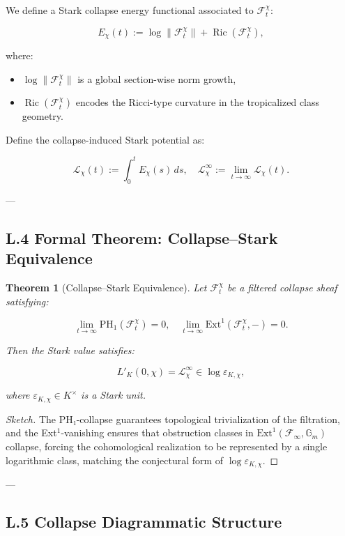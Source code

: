 \documentclass[11pt]{article}
\newtheorem{theorem}{Theorem}[section]
\begin{document}
We define a Stark collapse energy functional associated to $\mathcal{F}^\chi_t$:

\[
E_\chi(t) := \log \|\mathcal{F}^\chi_t\| + \operatorname{Ric}(\mathcal{F}^\chi_t),
\]

where:
\begin{itemize}
  \item $\log \|\mathcal{F}^\chi_t\|$ is a global section-wise norm growth,
  \item $\operatorname{Ric}(\mathcal{F}^\chi_t)$ encodes the Ricci-type curvature in the tropicalized class geometry.
\end{itemize}

Define the collapse-induced Stark potential as:

\[
\mathcal{L}_\chi(t) := \int_0^t E_\chi(s) \, ds,
\quad
\mathcal{L}_\chi^\infty := \lim_{t \to \infty} \mathcal{L}_\chi(t).
\]

---

\subsection*{L.4 Formal Theorem: Collapse–Stark Equivalence}

\begin{theorem}[Collapse–Stark Equivalence]
Let $\mathcal{F}^\chi_t$ be a filtered collapse sheaf satisfying:

\[
\lim_{t \to \infty} \mathrm{PH}_1(\mathcal{F}^\chi_t) = 0, \quad \lim_{t \to \infty} \mathrm{Ext}^1(\mathcal{F}^\chi_t, -) = 0.
\]

Then the Stark value satisfies:

\[
L'_K(0, \chi) = \mathcal{L}_\chi^\infty \in \log \varepsilon_{K,\chi},
\]

where $\varepsilon_{K,\chi} \in K^\times$ is a Stark unit.
\end{theorem}

\begin{proof}[Sketch]
The PH₁-collapse guarantees topological trivialization of the filtration, and the Ext$^1$-vanishing ensures that obstruction classes in $\mathrm{Ext}^1(\mathcal{F}_\infty, \mathbb{G}_m)$ collapse, forcing the cohomological realization to be represented by a single logarithmic class, matching the conjectural form of $\log \varepsilon_{K,\chi}$.
\end{proof}

---

\subsection*{L.5 Collapse Diagrammatic Structure}
\end{document}
